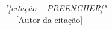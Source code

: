 \vspace*{\fill}
\begin{flushright}
    \textit{"[citação -- PREENCHER]"} \\
    --- [Autor da citação]
\end{flushright}
